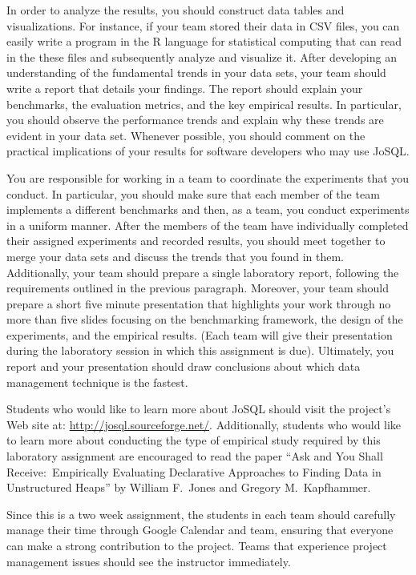 In order to analyze the results, you should construct data tables and visualizations.  For instance, if your team stored
their data in CSV files, you can easily write a program in the R language for statistical computing that can read in the
these files and subsequently analyze and visualize it. After developing an understanding of the fundamental
trends in your data sets, your team should write a report that details your findings.  The report should explain your
benchmarks, the evaluation metrics, and the key empirical results.  In particular, you should observe the performance
trends and explain why these trends are evident in your data set.  Whenever possible, you should comment on the
practical implications of your results for software developers who may use JoSQL.  

You are responsible for working in a team to coordinate the experiments that you conduct.  In particular, you should
make sure that each member of the team implements a different benchmarks and then, as a team, you conduct experiments in
a uniform manner.  After the members of the team have individually completed their assigned experiments and recorded
results, you should meet together to merge your data sets and discuss the trends that you found in them.  Additionally,
your team should prepare a single laboratory report, following the requirements outlined in the previous paragraph.
Moreover, your team should prepare a short five minute presentation that highlights your work through no more than five
slides focusing on the benchmarking framework, the design of the experiments, and the empirical results. (Each team will
  give their presentation during the laboratory session in which this assignment is due). Ultimately, you report and
your presentation should draw conclusions about which data management technique is the fastest.

Students who would like to learn more about JoSQL should visit the project's Web site at:
\url{http://josql.sourceforge.net/}. Additionally, students who would like to learn more about conducting the type of
empirical study required by this laboratory assignment are encouraged to read the paper ``Ask and You Shall Receive:\
Empirically Evaluating Declarative Approaches to Finding Data in Unstructured Heaps'' by William F.\ Jones and Gregory
M.\ Kapfhammer.

Since this is a two week assignment, the students in each team should carefully manage their time through Google
Calendar and team, ensuring that everyone can make a strong contribution to the project. Teams that experience project
management issues should see the instructor immediately.

